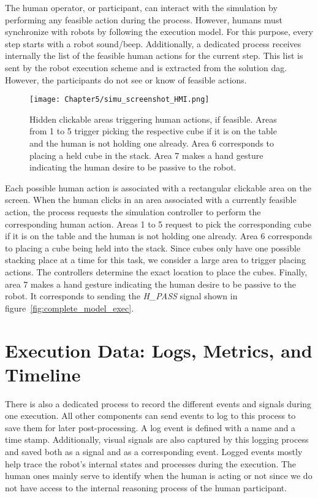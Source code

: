 The human operator, or participant, can interact with the simulation by performing any feasible action during the process. However, humans must synchronize with robots by following the execution model. For this purpose, every step starts with a robot sound/beep. Additionally, a dedicated process receives internally the list of the feasible human actions for the current step. This list is sent by the robot execution scheme and is extracted from the solution \acrshort{dag}. However, the participants do not see or know of feasible actions.

\begin{figure}[h]
    \centering
    \texttt{[image: Chapter5/simu\_screenshot\_HMI.png]}
    \caption{Hidden clickable areas triggering human actions, if feasible. Areas from 1 to 5 trigger picking the respective cube if it is on the table and the human is not holding one already. Area 6 corresponds to placing a held cube in the stack. Area 7 makes a hand gesture indicating the human desire to be passive to the robot.}
    \label{fig:hmi}
\end{figure}

Each possible human action is associated with a rectangular clickable area on the screen. When the human clicks in an area associated with a currently feasible action, the process requests the simulation controller to perform the corresponding human action. Areas 1 to 5 request to pick the corresponding cube if it is on the table and the human is not holding one already. Area 6 corresponds to placing a cube being held into the stack. Since cubes only have one possible stacking place at a time for this task, we consider a large area to trigger placing actions. The controllers determine the exact location to place the cubes. Finally, area 7 makes a hand gesture indicating the human desire to be passive to the robot. It corresponds to sending the \textit{H\_PASS} signal shown in figure~\ref{fig:complete_model_exec}.

\section{Execution Data: Logs, Metrics, and Timeline}

There is also a dedicated process to record the different events and signals during one execution. All other components can send events to log to this process to save them for later post-processing. A log event is defined with a name and a time stamp. Additionally, visual signals are also captured by this logging process and saved both as a signal and as a corresponding event. Logged events mostly help trace the robot's internal states and processes during the execution. The human ones mainly serve to identify when the human is acting or not since we do not have access to the internal reasoning process of the human participant. 

